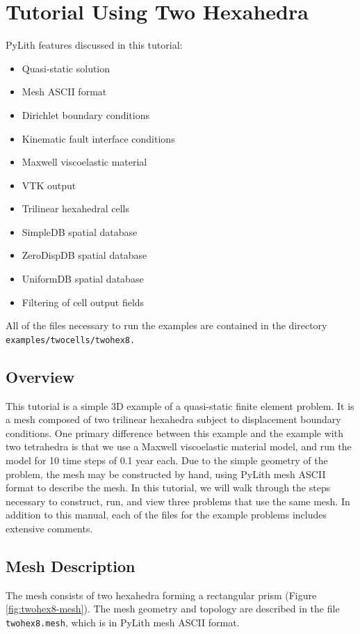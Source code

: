 
\section{\label{sec:Tutorial-Two-hexahedra}Tutorial Using Two Hexahedra}

PyLith features discussed in this tutorial:
\begin{itemize}
\item Quasi-static solution
\item Mesh ASCII format
\item Dirichlet boundary conditions
\item Kinematic fault interface conditions
\item Maxwell viscoelastic material
\item VTK output
\item Trilinear hexahedral cells
\item SimpleDB spatial database
\item ZeroDispDB spatial database
\item UniformDB spatial database
\item Filtering of cell output fields
\end{itemize}
All of the files necessary to run the examples are contained in the
directory \texttt{examples/twocells/twohex8.}


\subsection{Overview}

This tutorial is a simple 3D example of a quasi-static finite element
problem. It is a mesh composed of two trilinear hexahedra subject
to displacement boundary conditions. One primary difference between
this example and the example with two tetrahedra is that we use a
Maxwell viscoelastic material model, and run the model for 10 time
steps of 0.1 year each. Due to the simple geometry of the problem,
the mesh may be constructed by hand, using PyLith mesh ASCII format
to describe the mesh. In this tutorial, we will walk through the steps
necessary to construct, run, and view three problems that use the
same mesh. In addition to this manual, each of the files for the example
problems includes extensive comments.


\subsection{Mesh Description}

The mesh consists of two hexahedra forming a rectangular prism (Figure
\ref{fig:twohex8-mesh}). The mesh geometry and topology are described
in the file \texttt{twohex8.mesh}, which is in PyLith mesh ASCII format.

